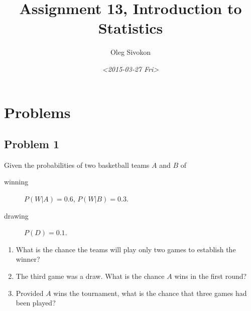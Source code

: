 \documentclass[11pt]{article}
\author{Oleg Sivokon}
\date{\textit{<2015-03-27 Fri>}}
\title{Assignment 13, Introduction to Statistics}
\begin{document}
\maketitle
\tableofcontents



\clearpage

\section{Problems}
\label{sec-1}

\subsection{Problem 1}
\label{sec-1-1}
Given the probabilities of two basketball teams $A$ and $B$ of
\begin{description}
\item[{winning}] $P(W | A) = 0.6$, $P(W | B) = 0.3$.
\item[{drawing}] $P(D) = 0.1$.
\end{description}


\begin{enumerate}
\item What is the chance the teams will play only two games to establish
the winner?
\item The third game was a draw.  What is the chance $A$ wins in the
first round?
\item Provided $A$ wins the tournament, what is the chance that three
games had been played?
\end{enumerate}
\end{document}
